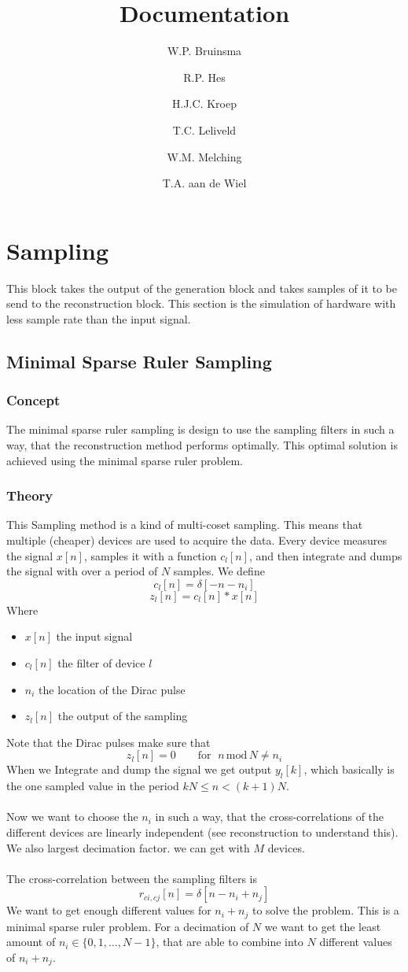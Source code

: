 \documentclass[report, oneside, a4paper, openany]{memoir}
\title{Documentation}
\author{W.P. Bruinsma \and R.P. Hes \and H.J.C. Kroep \and T.C. Leliveld \and W.M. Melching \and T.A. aan de Wiel}
\begin{document}
\chapter{Sampling}
This block takes the output of the generation block and takes samples of it to be send to the reconstruction block. 
This section is the simulation of hardware with less sample rate than the input signal.


\section{Minimal Sparse Ruler Sampling}
\subsection{Concept}
The minimal sparse ruler sampling is design to use the sampling filters in such a way, that the reconstruction method performs optimally. This optimal solution is achieved using the minimal sparse ruler problem.
\subsection{Theory}
This Sampling method is a kind of multi-coset sampling. This means that multiple (cheaper) devices are used to acquire the data. Every device measures the signal $x[n]$, samples it with a function $c_l[n]$, and then integrate and dumps the signal with over a period of $N$ samples. We define 
$$
c_l[n] = \delta[-n -n_i]
$$
$$
z_l[n] = c_l[n]\ast x[n] 
$$
Where
\begin{itemize}
\item $x[n]$ the input signal
\item $c_l[n]$ the filter of device $l$
\item $n_i$ the location of the Dirac pulse
\item $z_l[n]$ the output of the sampling
\end{itemize}
Note that the Dirac pulses make sure that
$$z_l[n]=0 \quad \quad \text{for }\;n\,\text{mod}\,N\neq n_i$$
When we Integrate and dump the signal we get output $y_l[k]$, which basically is the one sampled value in the period $kN\leq n<(k+1)N$.\\
\\
Now we want to choose the $n_i$ in such a way, that the cross-correlations of the different devices are linearly independent (see reconstruction to understand this). We also largest decimation factor. we can get with $M$ devices.\\
\\
The cross-correlation between the sampling filters is 
$$
r_{ci,cj}[n] = \delta [n-n_i+n_j]
$$
We want to get enough different values for $n_i+n_j$ to solve the problem. This is a minimal sparse ruler problem. For a decimation of $N$ we want to get the least amount of $n_i \in \{0,1,\dots,N-1\}$, that are able to combine into $N$ different values of $n_i+n_j$. 
\end{document}
